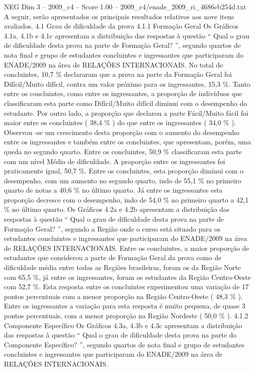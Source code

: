 \begin{textsample}{NEG Dim 3 – 2009\_c4 – Score 1.00 – 2009\_c4/enade\_2009\_ri\_4686cb254d.txt}
A seguir, serão apresentados os principais resultados relativos aos nove itens avaliados. 4.1 Grau de dificuldade da prova 4.1.1 Formação Geral Os Gráficos 4.1a, 4.1b e 4.1c apresentam a distribuição das respostas à questão “ Qual o grau de dificuldade desta prova na parte de Formação Geral? ”, segundo quartos de nota final e grupo de estudantes concluintes e ingressantes que participaram do ENADE/2009 na área de RELAÇÕES INTERNACIONAIS.
No total de concluintes, 10,7 \% declararam que a prova na parte da Formação Geral foi Difícil/Muito difícil, contra um valor próximo para os ingressantes, 15,3 \%.
Tanto entre os concluintes, como entre os ingressantes, a proporção de indivíduos que classificaram esta parte como Difícil/Muito difícil diminui com o desempenho do estudante.
Por outro lado, a proporção que declarou a parte Fácil/Muito fácil foi maior entre os concluintes ( 38,4 \% ) do que entre os ingressantes ( 34,0 \% ).
Observou -se um crescimento desta proporção com o aumento do desempenho entre os ingressantes e também entre os concluintes, que apresentam, porém, uma queda no segundo quarto.
Entre os concluintes, 50,9 \% classificaram esta parte com um nível Médio de dificuldade.
A proporção entre os ingressantes foi praticamente igual, 50,7 \%.
Entre os concluintes, esta proporção diminui com o desempenho, com um aumento no segundo quarto, indo de 55,1 \% no primeiro quarto de notas a 40,6 \% no último quarto.
Já entre os ingressantes esta proporção decresce com o desempenho, indo de 54,0 \% no primeiro quarto a 42,1 \% no último quarto.
Os Gráficos 4.2a e 4.2b apresentam a distribuição das respostas à questão “ Qual o grau de dificuldade desta prova na parte de Formação Geral? ”, segundo a Região onde o curso está situado para os estudantes concluintes e ingressantes que participaram do ENADE/2009 na área de RELAÇÕES INTERNACIONAIS.
Entre os concluintes, a maior proporção de estudantes que considerou a parte de Formação Geral da prova como de dificuldade média entre todas as Regiões brasileiras, foram os da Região Norte com 65,5 \%, já entre os ingressantes, foram os estudantes da Região Centro-Oeste com 52,7 \%.
Esta resposta entre os concluintes experimentou uma variação de 17 pontos percentuais com a menor proporção na Região Centro-Oeste ( 48,3 \% ).
Entre os ingressantes a variação para esta resposta é muito pequena, de quase 3 pontos percentuais, com a menor proporção na Região Nordeste ( 50,0 \% ). 4.1.2 Componente Específico Os Gráficos 4.3a, 4.3b e 4.3c apresentam a distribuição das respostas à questão “ Qual o grau de dificuldade desta prova na parte do Componente Específico? ”, segundo quartos de nota final e grupo de estudantes concluintes e ingressantes que participaram do ENADE/2009 na área de RELAÇÕES INTERNACIONAIS.

\end{textsample}
